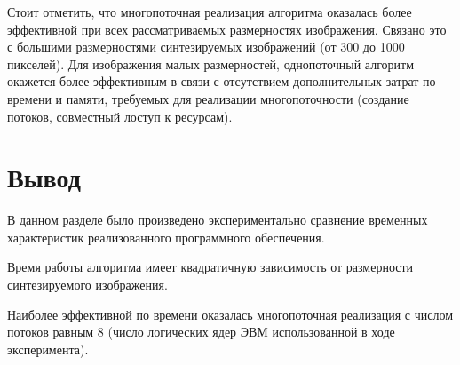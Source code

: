 Стоит отметить, что многопоточная реализация алгоритма оказалась  более эффективной при всех рассматриваемых размерностях изображения. Связано это с большими размерностями синтезируемых изображений (от 300 до 1000 пикселей). Для изображения малых размерностей, однопоточный алгоритм окажется более эффективным в связи с отсутствием дополнительных затрат по времени и памяти, требуемых для реализации многопоточности (создание потоков, совместный лоступ к ресурсам).

\section{Вывод}

В данном разделе было произведено экспериментально сравнение временных характеристик реализованного программного обеспечения.

Время работы алгоритма имеет квадратичную зависимость от размерности синтезируемого изображения.

Наиболее эффективной по времени оказалась многопоточная реализация с числом потоков равным 8 (число логических ядер ЭВМ использованной в ходе эксперимента).